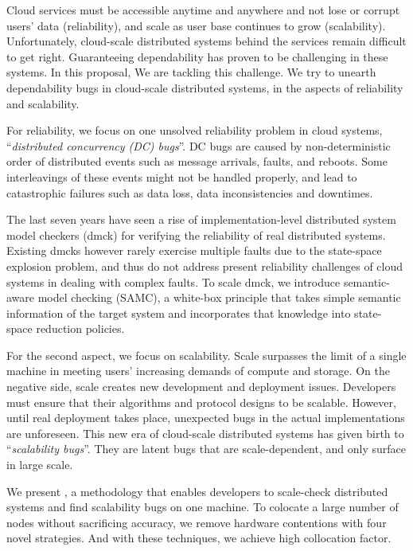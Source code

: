 Cloud services must be accessible anytime and anywhere and not lose or corrupt
users' data (reliability), and scale as user base continues to grow
(scalability). Unfortunately, cloud-scale distributed systems behind the
services remain difficult to get right. Guaranteeing dependability has proven
to be challenging in these systems. In this proposal, We are tackling this
challenge. We try to unearth dependability bugs in cloud-scale distributed
systems, in the aspects of reliability and scalability.

For reliability, we focus on one unsolved reliability problem in cloud systems,
``{\em distributed concurrency (DC) bugs}''. DC bugs are caused by non-deterministic
order of distributed events such as message arrivals, faults, and reboots. Some
interleavings of these events might not be handled properly, and lead to
catastrophic failures such as data loss, data inconsistencies and downtimes. 

The last seven years have seen a rise of implementation-level distributed system
model checkers (dmck) for verifying the reliability of real distributed systems.
Existing dmcks however rarely exercise multiple faults due to the state-space
explosion problem, and thus do not address present reliability challenges of
cloud systems in dealing with complex faults. To scale dmck, we introduce
semantic-aware model checking (SAMC), a white-box principle that takes simple
semantic information of the target system and incorporates that knowledge into
state-space reduction policies.

For the second aspect, we focus on scalability. Scale surpasses the limit of a
single machine in meeting users' increasing demands of compute and storage. On
the negative side, scale creates new development and deployment issues.
Developers must ensure that their algorithms and protocol designs to be
scalable. However, until real deployment takes place, unexpected bugs in the
actual implementations are unforeseen. This new era of cloud-scale distributed
systems has given birth to ``{\em scalability bugs}''. They are latent bugs
that are scale-dependent, and only surface in large scale.

We present \sck, a methodology that enables developers to scale-check
distributed systems and find scalability bugs on one machine. To colocate a
large number of nodes without sacrificing accuracy, we remove hardware
contentions with four novel strategies. And with these techniques, we achieve
high collocation factor.
